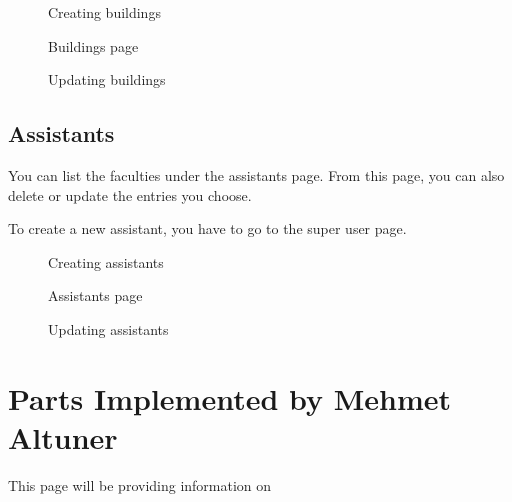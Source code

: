 \documentclass[letterpaper,10pt,english]{sphinxmanual}
\begin{document}
\begin{figure}[htbp]
\centering
\capstart

\noindent{}
\caption{Creating buildings}\label{\detokenize{user/kaplan:id17}}\end{figure}

\begin{figure}[htbp]
\centering
\capstart

\noindent{}
\caption{Buildings page}\label{\detokenize{user/kaplan:id18}}\end{figure}

\begin{figure}[htbp]
\centering
\capstart

\noindent{}
\caption{Updating buildings}\label{\detokenize{user/kaplan:id19}}\end{figure}


\subsection{Assistants}
\label{\detokenize{user/kaplan:assistants}}
You can list the faculties under the assistants page. From this page, you can also delete or update
the entries you choose.

To create a new assistant, you have to go to the super user page.

\begin{figure}[htbp]
\centering
\capstart

\noindent{}
\caption{Creating assistants}\label{\detokenize{user/kaplan:id20}}\end{figure}

\begin{figure}[htbp]
\centering
\capstart

\noindent{}
\caption{Assistants page}\label{\detokenize{user/kaplan:id21}}\end{figure}

\begin{figure}[htbp]
\centering
\capstart

\noindent{}
\caption{Updating assistants}\label{\detokenize{user/kaplan:id22}}\end{figure}


\section{Parts Implemented by Mehmet Altuner}
\label{\detokenize{user/mehmet:parts-implemented-by-mehmet-altuner}}\label{\detokenize{user/mehmet::doc}}
This page will be providing information on
\end{document}
